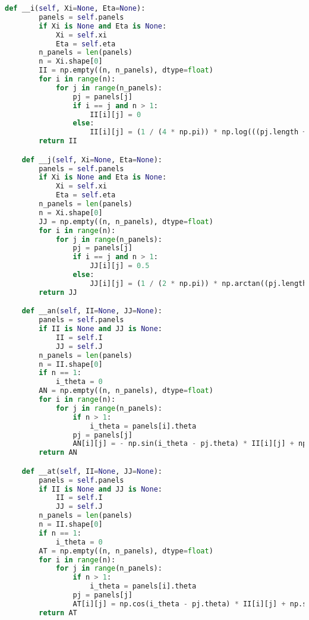 \begin{lstlisting}[language=Python]
    def __i(self, Xi=None, Eta=None):
        panels = self.panels
        if Xi is None and Eta is None:
            Xi = self.xi
            Eta = self.eta
        n_panels = len(panels)
        n = Xi.shape[0]
        II = np.empty((n, n_panels), dtype=float)
        for i in range(n):
            for j in range(n_panels):
                pj = panels[j]
                if i == j and n > 1:
                    II[i][j] = 0
                else:
                    II[i][j] = (1 / (4 * np.pi)) * np.log(((pj.length + 2 * Xi[i][j]) ** 2 + 4 * (Eta[i][j] ** 2)) / ((pj.length - 2 * Xi[i][j]) ** 2 + 4 * (Eta[i][j] ** 2)))
        return II

    def __j(self, Xi=None, Eta=None):
        panels = self.panels
        if Xi is None and Eta is None:
            Xi = self.xi
            Eta = self.eta
        n_panels = len(panels)
        n = Xi.shape[0]
        JJ = np.empty((n, n_panels), dtype=float)
        for i in range(n):
            for j in range(n_panels):
                pj = panels[j]
                if i == j and n > 1:
                    JJ[i][j] = 0.5
                else:
                    JJ[i][j] = (1 / (2 * np.pi)) * np.arctan((pj.length - 2 * Xi[i][j])/ (2 * Eta[i][j])) + (1 / (2 * np.pi)) * np.arctan((pj.length + 2 * Xi[i][j])/ (2 * Eta[i][j]))
        return JJ

    def __an(self, II=None, JJ=None):
        panels = self.panels
        if II is None and JJ is None:
            II = self.I
            JJ = self.J
        n_panels = len(panels)
        n = II.shape[0]
        if n == 1:
            i_theta = 0
        AN = np.empty((n, n_panels), dtype=float)
        for i in range(n):
            for j in range(n_panels):
                if n > 1:
                    i_theta = panels[i].theta
                pj = panels[j]
                AN[i][j] = - np.sin(i_theta - pj.theta) * II[i][j] + np.cos(i_theta - pj.theta) * JJ[i][j]
        return AN

    def __at(self, II=None, JJ=None):
        panels = self.panels
        if II is None and JJ is None:
            II = self.I
            JJ = self.J
        n_panels = len(panels)
        n = II.shape[0]
        if n == 1:
            i_theta = 0
        AT = np.empty((n, n_panels), dtype=float)
        for i in range(n):
            for j in range(n_panels):
                if n > 1:
                    i_theta = panels[i].theta
                pj = panels[j]
                AT[i][j] = np.cos(i_theta - pj.theta) * II[i][j] + np.sin(i_theta - pj.theta) * JJ[i][j]
        return AT


\end{lstlisting}
